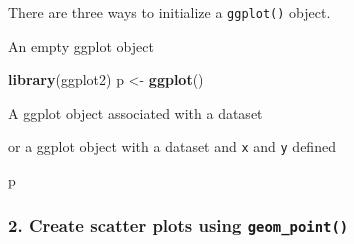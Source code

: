 \documentclass[]{article}
\newenvironment{Shaded}{\begin{snugshade}}{\end{snugshade}}
\newcommand{\DataTypeTok}[1]{\textcolor[rgb]{0.13,0.29,0.53}{#1}}
\newcommand{\DecValTok}[1]{\textcolor[rgb]{0.00,0.00,0.81}{#1}}
\newcommand{\KeywordTok}[1]{\textcolor[rgb]{0.13,0.29,0.53}{\textbf{#1}}}
\newcommand{\NormalTok}[1]{#1}
\newcommand{\OperatorTok}[1]{\textcolor[rgb]{0.81,0.36,0.00}{\textbf{#1}}}
\newcommand{\StringTok}[1]{\textcolor[rgb]{0.31,0.60,0.02}{#1}}
\begin{document}
There are three ways to initialize a \texttt{ggplot()} object.

An empty ggplot object

\begin{Shaded}
\begin{Highlighting}[]
\KeywordTok{library}\NormalTok{(ggplot2)}
\NormalTok{p <-}\StringTok{ }\KeywordTok{ggplot}\NormalTok{()         }
\end{Highlighting}
\end{Shaded}

A ggplot object associated with a dataset

\begin{Shaded}
\end{Shaded}

or a ggplot object with a dataset and \texttt{x} and \texttt{y} defined

\begin{Shaded}
\end{Shaded}

\begin{Shaded}
\begin{Highlighting}[]
\NormalTok{p}
\end{Highlighting}
\end{Shaded}

\hypertarget{create-scatter-plots-using-geom_point}{%
\subsubsection{\texorpdfstring{2. Create scatter plots using
\texttt{geom\_point()}}{2. Create scatter plots using geom\_point()}}\label{create-scatter-plots-using-geom_point}}
\end{document}
